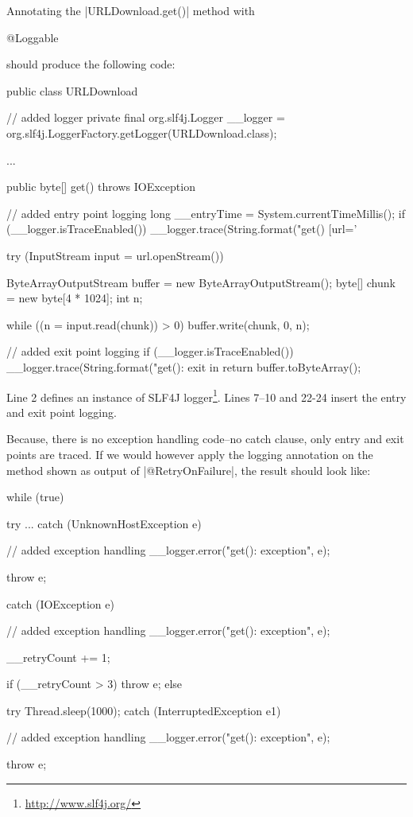Annotating the \javainline|URLDownload.get()| method with
%
\begin{javacode}
@Loggable
\end{javacode}
%
should produce the following code:
%
\begin{javacode}
public class URLDownload {
  // added logger
  private final org.slf4j.Logger __logger = org.slf4j.LoggerFactory.getLogger(URLDownload.class);

  ...

  public byte[] get() throws IOException {
    // added entry point logging
    long __entryTime = System.currentTimeMillis();
    if (__logger.isTraceEnabled()) {
      __logger.trace(String.format("get() [url='%
    }

    try (InputStream input = url.openStream()) {

      ByteArrayOutputStream buffer = new ByteArrayOutputStream();
      byte[] chunk = new byte[4 * 1024];
      int n;

      while ((n = input.read(chunk)) > 0) {
        buffer.write(chunk, 0, n);
      }

      // added exit point logging
      if (__logger.isTraceEnabled()) {
        __logger.trace(String.format("get(): exit in %
      }
      return buffer.toByteArray();
    }
  }
}
\end{javacode}

Line 2 defines an instance of SLF4J logger\footnote{\url{http://www.slf4j.org/}}.
Lines 7--10 and 22-24 insert the entry and exit point logging.

Because, there is no exception handling code--\Ie no catch clause, only entry and exit points are traced.
If we would however apply the logging annotation on the method shown as output of \javainline|@RetryOnFailure|, the result should look like:
%
\begin{javacode}
while (true) {
  try {
    ...
  } catch (UnknownHostException e) {
    // added exception handling
    __logger.error("get(): exception", e);

    throw e;
  } catch (IOException e) {
    // added exception handling
    __logger.error("get(): exception", e);

    __retryCount += 1;

    if (__retryCount > 3) {
      throw e;
    } else {
      try {
        Thread.sleep(1000);
      } catch (InterruptedException e1) {
        // added exception handling
        __logger.error("get(): exception", e);

        throw e;
      }
    }
  }
}
\end{javacode}

